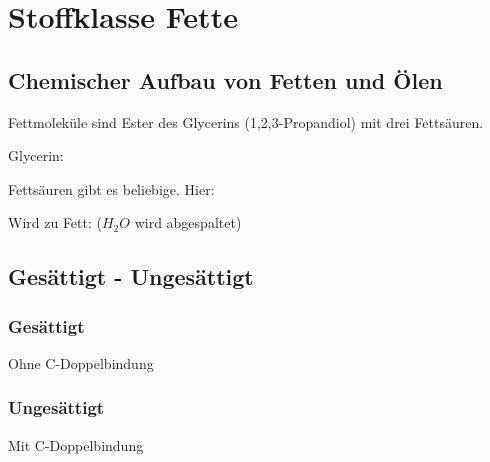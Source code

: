 \section{Stoffklasse Fette}

\subsection{Chemischer Aufbau von Fetten und Ölen}
Fettmoleküle sind Ester des Glycerins (1,2,3-Propandiol) mit drei Fettsäuren.

Glycerin:\\

Fettsäuren gibt es beliebige. Hier:\\

Wird zu Fett: ($H_2O$ wird abgespaltet) \\

\subsection{Gesättigt - Ungesättigt}
\subsubsection{Gesättigt}
Ohne C-Doppelbindung
\subsubsection{Ungesättigt}
Mit C-Doppelbindung
